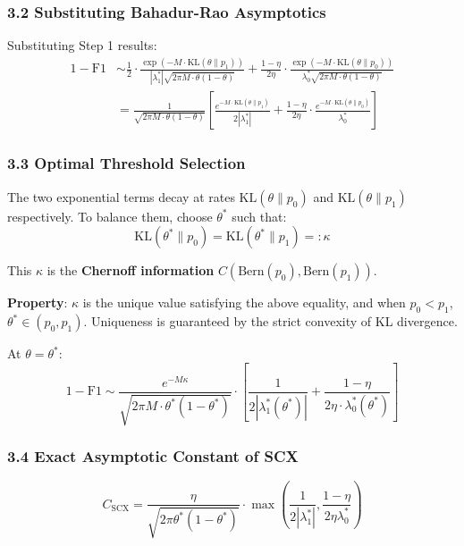 \documentclass[
  12pt,
]{article}
\begin{document}
\subsubsection{3.2 Substituting Bahadur-Rao Asymptotics}\label{substituting-bahadur-rao-asymptotics}

Substituting Step 1 results: \[\begin{aligned}
1 - \text{F1} &\sim \frac{1}{2} \cdot \frac{\exp(-M \cdot \text{KL}(\theta \| p_1))}{|\lambda_1^*|\sqrt{2\pi M \cdot \theta(1-\theta)}} + \frac{1-\eta}{2\eta} \cdot \frac{\exp(-M \cdot \text{KL}(\theta \| p_0))}{\lambda_0^*\sqrt{2\pi M \cdot \theta(1-\theta)}} \\
&= \frac{1}{\sqrt{2\pi M \cdot \theta(1-\theta)}} \left[\frac{e^{-M \cdot \text{KL}(\theta \| p_1)}}{2|\lambda_1^*|} + \frac{1-\eta}{2\eta} \cdot \frac{e^{-M \cdot \text{KL}(\theta \| p_0)}}{\lambda_0^*}\right]
\end{aligned}\]

\subsubsection{3.3 Optimal Threshold Selection}\label{optimal-threshold-selection}

The two exponential terms decay at rates \(\text{KL}(\theta \| p_0)\) and \(\text{KL}(\theta \| p_1)\) respectively. To balance them, choose \(\theta^*\) such that:
\[\text{KL}(\theta^* \| p_0) = \text{KL}(\theta^* \| p_1) =: \kappa\]

This \(\kappa\) is the \textbf{Chernoff information} \(C(\text{Bern}(p_0), \text{Bern}(p_1))\).

\textbf{Property}: \(\kappa\) is the unique value satisfying the above equality, and when \(p_0 < p_1\), \(\theta^* \in (p_0, p_1)\). Uniqueness is guaranteed by the strict convexity of KL divergence.

At \(\theta = \theta^*\):
\[1 - \text{F1} \sim \frac{e^{-M\kappa}}{\sqrt{2\pi M \cdot \theta^*(1-\theta^*)}} \cdot \left[\frac{1}{2|\lambda_1^*(\theta^*)|} + \frac{1-\eta}{2\eta \cdot \lambda_0^*(\theta^*)}\right]\]

\subsubsection{3.4 Exact Asymptotic Constant of SCX}\label{exact-asymptotic-constant-of-scx}

\[\boxed{C_{\text{SCX}} = \frac{\eta}{\sqrt{2\pi\theta^*(1-\theta^*)}} \cdot \max\left(\frac{1}{2|\lambda_1^*|}, \frac{1-\eta}{2\eta\lambda_0^*}\right)}\]
\end{document}
